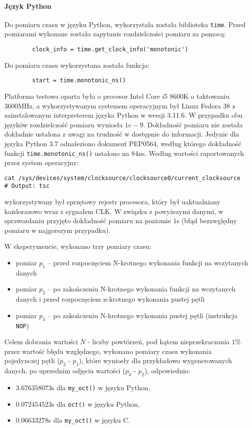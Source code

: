 \documentclass[11pt]{article}
\begin{document}
		\paragraph{Język Python}
		Do pomiaru czasu w języku Python, wykorzystała została biblioteka \lstinline{time}.
		Przed pomiarami wykonane zostało zapytanie rozdzielczości pomiaru za pomocą:
		\begin{lstlisting}
		clock_info = time.get_clock_info('monotonic')
		\end{lstlisting}
		Do pomiaru czasu wykorzystana została funkcja:
		\begin{lstlisting}
		start = time.monotonic_ns()
		\end{lstlisting}

		Platforma testowa oparta była o procesor Intel Core i5 8600K o taktowaniu 3600MHz, 
		a wykorzystywanym systemem operacyjnym był Linux Fedora 38 z zainstalowanym interpreterem języka Python w wersji 3.11.6. 
		W przypadku obu języków rozdzielczość pomiaru wyniosła $1e-9$.
		Dokładność pomiaru nie została dokładnie ustalona z uwagi na trudność w dostępnie do informacji.
		Jedynie dla języka Python 3.7 odnaleziono dokument PEP0564, według którego dokładność funkcji \texttt{time.monotonic\_ns()} ustalono na 84ns.
		Według wartości raportowanych przez system operacyjny:
		\begin{lstlisting}
cat /sys/devices/system/clocksource/clocksource0/current_clocksource
# Output: tsc
		\end{lstlisting}
		wykorzystywany był sprzętowy rejestr procesora, który był uaktualniany każdorazowo wraz z sygnałem CLK.
		W związku z powyższymi danymi, w sprawozdaniu przyjęto dokładność pomiaru na poziomie $1$s (błąd bezzwględny pomiaru w najgorszym przypadku).
		
		W eksperymencie, wykonano trzy pomiary czasu:
		\begin{itemize}
			\item pomiar $p_1$ – przed rozpoczęciem N-krotnego wykonania funkcji na wczytanych danych
			\item pomiar $p_2$ – po zakończeniu N-krotnego wykonania funkcji na wczytanych danych i przed rozpoczęciem n-krotnego wykonania pustej pętli
			\item pomiar $p_3$ – po zakończeniu N-krotnego wykonania pustej pętli (instrukcja \texttt{NOP})
		\end{itemize}
		Celem dobrania wartości $N$ - liczby powtórzeń, pod kątem nieprzekraczania $1\%$ przez wartość błędu względnego, wykonano pomiary czasu wykonania pojedynczej pętli ($p_2$ - $p_1$), 
		które wyniosły dla przykładowo wygenerowanych danych, po uprzednim odjęciu wartości ($p_3$ - $p_2$), odpowiednio:
		\begin{itemize}
			\item $3.676358073$s dla \texttt{my\_oct()} w języku Python,
			\item $0.072454523$s dla \texttt{oct()} w języku Python,
			\item $0.06633278$s dla \texttt{my\_oct()} w języku C.
		\end{itemize}
\end{document}
